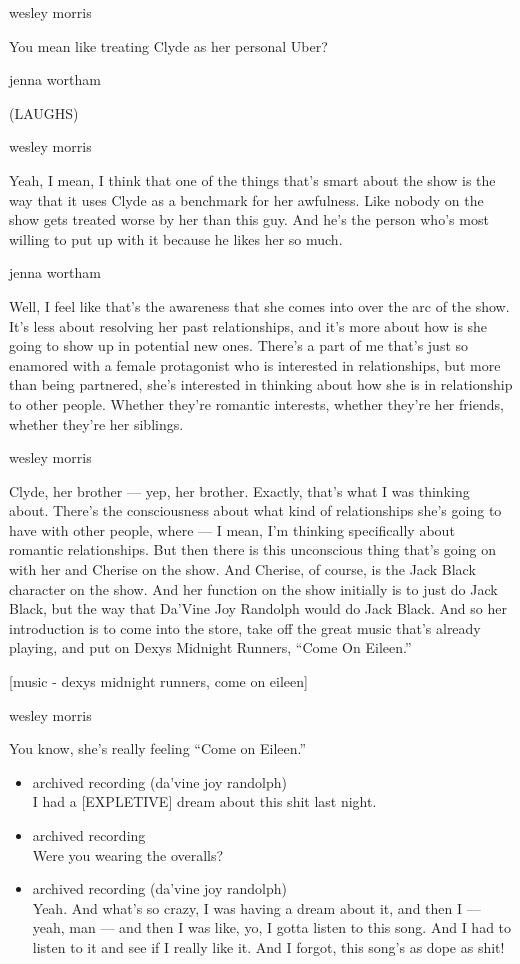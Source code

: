 wesley morris

You mean like treating Clyde as her personal Uber?

jenna wortham

(LAUGHS)

wesley morris

Yeah, I mean, I think that one of the things that's smart about the show
is the way that it uses Clyde as a benchmark for her awfulness. Like
nobody on the show gets treated worse by her than this guy. And he's the
person who's most willing to put up with it because he likes her so
much.

jenna wortham

Well, I feel like that's the awareness that she comes into over the arc
of the show. It's less about resolving her past relationships, and it's
more about how is she going to show up in potential new ones. There's a
part of me that's just so enamored with a female protagonist who is
interested in relationships, but more than being partnered, she's
interested in thinking about how she is in relationship to other people.
Whether they're romantic interests, whether they're her friends, whether
they're her siblings.

wesley morris

Clyde, her brother --- yep, her brother. Exactly, that's what I was
thinking about. There's the consciousness about what kind of
relationships she's going to have with other people, where --- I mean,
I'm thinking specifically about romantic relationships. But then there
is this unconscious thing that's going on with her and Cherise on the
show. And Cherise, of course, is the Jack Black character on the show.
And her function on the show initially is to just do Jack Black, but the
way that Da'Vine Joy Randolph would do Jack Black. And so her
introduction is to come into the store, take off the great music that's
already playing, and put on Dexys Midnight Runners, ``Come On Eileen.''

{[}music - dexys midnight runners, come on eileen{]}

wesley morris

You know, she's really feeling ``Come on Eileen.''

\begin{itemize}
\item
  archived recording (da'vine joy randolph)\\
  I had a {[}EXPLETIVE{]} dream about this shit last night.
\item
  archived recording\\
  Were you wearing the overalls?
\item
  archived recording (da'vine joy randolph)\\
  Yeah. And what's so crazy, I was having a dream about it, and then I
  --- yeah, man --- and then I was like, yo, I gotta listen to this
  song. And I had to listen to it and see if I really like it. And I
  forgot, this song's as dope as shit!
\end{itemize}

